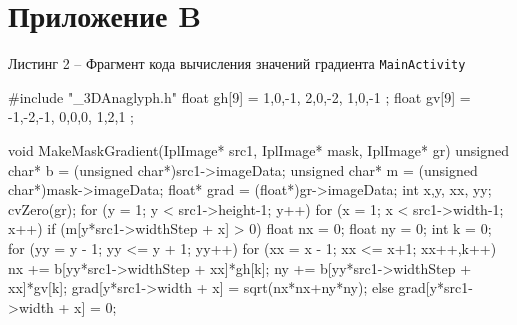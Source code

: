\documentclass[a4paper,12pt]{article}
\begin{document}
\section*{ \centering Приложение B} 

\begin{center}
	Листинг 2 -- Фрагмент кода вычисления значений градиента \verb|MainActivity|
\end{center}

\begin{MyCode}
	
#include "_3DAnaglyph.h"
float gh[9] = {
	1,0,-1,
	2,0,-2,
	1,0,-1
};
float gv[9] = {
	-1,-2,-1,
	0,0,0,
	1,2,1
};

void MakeMaskGradient(IplImage* src1, IplImage* mask, IplImage* gr)
{
	unsigned char* b = (unsigned char*)src1->imageData;
	unsigned char* m = (unsigned char*)mask->imageData;
	float* grad = (float*)gr->imageData;
	int x,y, xx, yy;
	cvZero(gr);
	for (y = 1; y < src1->height-1; y++)
	for (x = 1; x < src1->width-1; x++)
	{
		if (m[y*src1->widthStep + x] > 0)
		{
			float nx = 0; 
			float ny = 0;
			int k  = 0;
			for (yy = y - 1; yy <= y + 1; yy++)
			{
				for (xx = x - 1; xx <= x+1; xx++,k++)
				{
					nx += b[yy*src1->widthStep + xx]*gh[k];				
					ny += b[yy*src1->widthStep + xx]*gv[k];				
				}
			}
			grad[y*src1->width + x] = sqrt(nx*nx+ny*ny);
		}
		else
		grad[y*src1->width + x] = 0;
	}
}

\end{MyCode}
\end{document}
